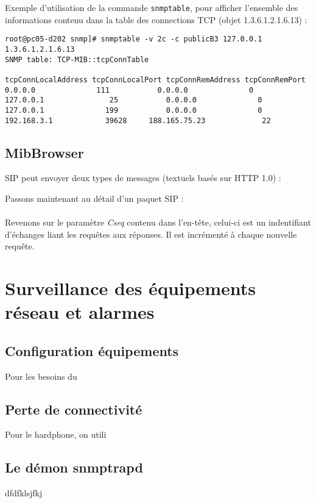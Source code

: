 \documentclass[12pt,a4paper,notitlepage]{article}
\begin{document}
Exemple d'utilisation de la commande \texttt{snmptable}, pour afficher l'ensemble des informations contenu dans la table des connections TCP (objet 1.3.6.1.2.1.6.13) :
 \lstset{
         basicstyle=\scriptsize\ttfamily,
         }
\begin{lstlisting}[title=snmptable]
root@pc05-d202 snmp]# snmptable -v 2c -c publicB3 127.0.0.1 1.3.6.1.2.1.6.13
SNMP table: TCP-MIB::tcpConnTable

tcpConnLocalAddress tcpConnLocalPort tcpConnRemAddress tcpConnRemPort
0.0.0.0              111           0.0.0.0              0
127.0.0.1               25           0.0.0.0              0
127.0.0.1              199           0.0.0.0              0
192.168.3.1            39628     188.165.75.23             22
\end{lstlisting}



\subsection{MibBrowser}
SIP peut envoyer deux types de messages (textuels basés sur HTTP 1.0) :


Passons maintenant au détail d'un paquet SIP :

\paragraph{} Revenons sur le paramètre \textit{Cseq} contenu dans l'en-tête, celui-ci est un indentifiant d'échanges liant les requêtes aux réponses. Il est incrémenté à chaque nouvelle requête.

\section{Surveillance des équipements réseau et alarmes}
\subsection{Configuration équipements}
Pour les besoins du

\subsection{Perte de connectivité}
Pour le hardphone, on utili

\subsection{Le démon snmptrapd}
dfdfklsjfkj
\end{document}
